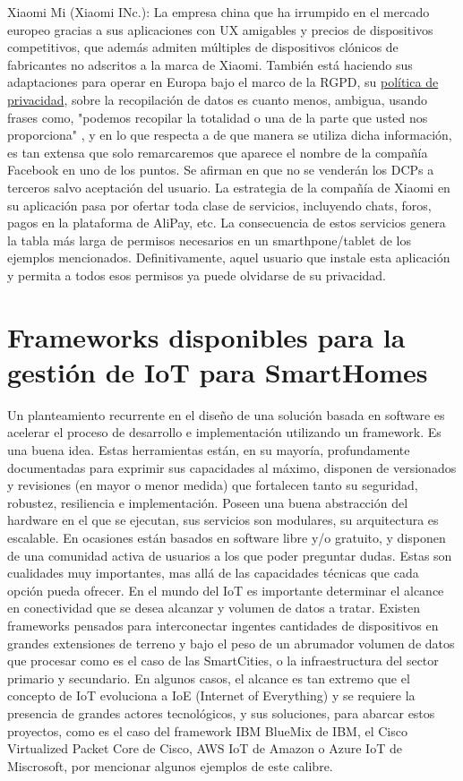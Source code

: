 Xiaomi Mi (Xiaomi INc.): La empresa china que ha irrumpido en el mercado europeo gracias a sus aplicaciones con UX amigables y precios de dispositivos competitivos, que además admiten múltiples de dispositivos clónicos de fabricantes no adscritos a la marca de Xiaomi. También está haciendo sus adaptaciones para operar en Europa bajo el marco de la RGPD, su \href{https://www.mi.com/es/about/privacy}{política de privacidad}, sobre la recopilación de datos es cuanto menos, ambigua, usando frases como, "podemos recopilar la totalidad o una de la parte que usted nos proporciona" , y en lo que respecta a de que manera se utiliza dicha información, es tan extensa que solo remarcaremos que aparece el nombre de la compañía Facebook en uno de los puntos. Se afirman en que no se venderán los DCPs a terceros salvo aceptación del usuario. La estrategia de la compañía de Xiaomi en su aplicación pasa por ofertar toda clase de servicios, incluyendo chats, foros, pagos en la plataforma de AliPay, etc. La consecuencia de estos servicios genera la tabla más larga de permisos necesarios en un smarthpone/tablet de los ejemplos mencionados. Definitivamente, aquel usuario que instale esta aplicación y permita a todos esos permisos ya puede olvidarse de su privacidad.

\section{Frameworks disponibles para la gestión de IoT para SmartHomes}
\label{ch:Capitulo2.2}

Un planteamiento recurrente en el diseño de una solución basada en software es acelerar el proceso de desarrollo e implementación utilizando un framework. Es una buena idea. Estas herramientas están, en su mayoría, profundamente documentadas para exprimir sus capacidades al máximo, disponen de versionados y revisiones (en mayor o menor medida) que fortalecen tanto su seguridad, robustez, resiliencia e implementación. Poseen una buena abstracción del hardware en el que se ejecutan, sus servicios son modulares, su arquitectura es escalable.  En ocasiones están basados en software libre y/o gratuito, y disponen de una comunidad activa de usuarios a los que poder preguntar dudas. Estas son cualidades muy importantes, mas allá de las capacidades técnicas que cada opción pueda ofrecer.
En el mundo del IoT es importante determinar el alcance en conectividad que se desea alcanzar y volumen de datos a tratar. Existen frameworks pensados para interconectar ingentes cantidades de dispositivos en grandes extensiones de terreno y bajo el peso de un abrumador volumen de datos que procesar como es el caso de las SmartCities, o la infraestructura del sector primario y secundario. En algunos casos, el alcance es tan extremo que el concepto de IoT evoluciona a IoE (Internet of Everything) y se requiere la presencia de grandes actores tecnológicos, y sus soluciones, para abarcar estos proyectos, como es el caso del framework IBM BlueMix de IBM, el Cisco Virtualized Packet Core de Cisco, AWS IoT de Amazon o Azure IoT de Miscrosoft, por mencionar algunos ejemplos de este calibre.

